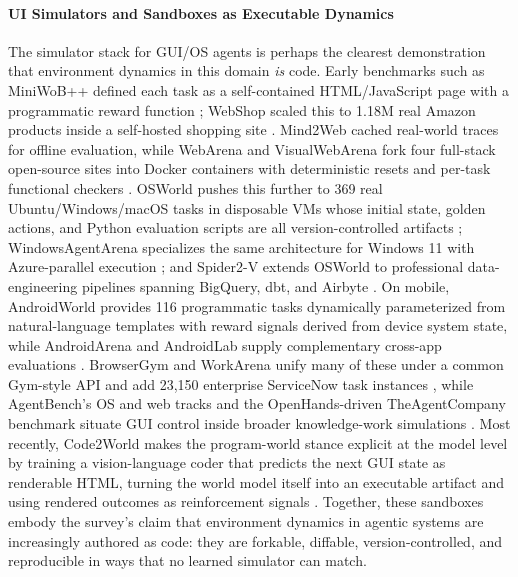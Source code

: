\paragraph{UI Simulators and Sandboxes as Executable Dynamics}

The simulator stack for GUI/OS agents is perhaps the clearest demonstration that environment dynamics in this domain \textit{is} code. Early benchmarks such as MiniWoB++ defined each task as a self-contained HTML/JavaScript page with a programmatic reward function \citep{liu2018reinforcementlearningwebinterfaces}; WebShop scaled this to 1.18M real Amazon products inside a self-hosted shopping site \citep{yao2023webshopscalablerealworldweb}. Mind2Web cached real-world traces for offline evaluation, while WebArena and VisualWebArena fork four full-stack open-source sites into Docker containers with deterministic resets and per-task functional checkers \citep{deng2023mind2webgeneralistagentweb,zhou2024webarenarealisticwebenvironment,koh2024visualwebarenaevaluatingmultimodalagents}. OSWorld pushes this further to 369 real Ubuntu/Windows/macOS tasks in disposable VMs whose initial state, golden actions, and Python evaluation scripts are all version-controlled artifacts \citep{xie2024osworldbenchmarkingmultimodalagents}; WindowsAgentArena specializes the same architecture for Windows 11 with Azure-parallel execution \citep{bonatti2024windowsagentarenaevaluating}; and Spider2-V extends OSWorld to professional data-engineering pipelines spanning BigQuery, dbt, and Airbyte \citep{cao2024spider2vfarmultimodalagents}. On mobile, AndroidWorld provides 116 programmatic tasks dynamically parameterized from natural-language templates with reward signals derived from device system state, while AndroidArena and AndroidLab supply complementary cross-app evaluations \citep{rawles2025androidworlddynamicbenchmarkingenvironment,xing2024understandingweaknesslargelanguage,xu2024androidlabtrainingsystematicbenchmarking}. BrowserGym and WorkArena unify many of these under a common Gym-style API and add 23,150 enterprise ServiceNow task instances \citep{drouin2024workarenacapablewebagents}, while AgentBench's OS and web tracks and the OpenHands-driven TheAgentCompany benchmark situate GUI control inside broader knowledge-work simulations \citep{liu2025agentbenchevaluatingllmsagents,xu2025theagentcompanybenchmarkingllmagents}. Most recently, Code2World makes the program-world stance explicit at the model level by training a vision-language coder that predicts the next GUI state as renderable HTML, turning the world model itself into an executable artifact and using rendered outcomes as reinforcement signals \citep{zheng2026code2worldguiworldmodel}. Together, these sandboxes embody the survey's claim that environment dynamics in agentic systems are increasingly authored as code: they are forkable, diffable, version-controlled, and reproducible in ways that no learned simulator can match.

